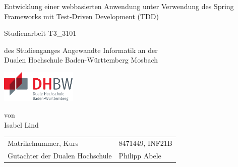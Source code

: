 \def\doctype{Dokumententyp}
\def\title{Entwicklung einer webbasierten Anwendung unter Verwendung des Spring Frameworks mit Test-Driven Development (TDD)}
\def\author{Isabel Lind}

\begin{titlepage}

	\vspace{10mm}

	\begin{center}
		\vspace{5mm}

		\huge \title

		\vspace{14.2pt}



		\vspace{42.6pt}

		\large Studienarbeit T3\_3101

		\vspace{42.6pt}

		\small des Studienganges Angewandte Informatik an der \\
		\large Dualen Hochschule Baden-Württemberg Mosbach

		\vspace{14.2pt}

		\includegraphics[height=1.5cm]{prefix/image/logo-dhbw.pdf}

		\vspace{42.6pt}

		\small von \\
		\large \author
	\end{center}

	\vspace{120pt} %

	\begin{table}[h]
		\centering
		\begin{tabular}{ll}
			\small Matrikelnummer, Kurs            & 8471449, INF21B \\
			\small Gutachter der Dualen Hochschule & Philipp Abele   \\
		\end{tabular}
	\end{table}

	\vspace{49.7pt}


\end{titlepage}